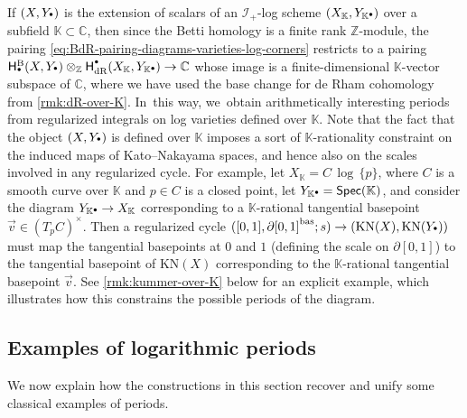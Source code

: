 \documentclass[JEP,XML,SOM,Unicode,NoFloatCountersInSection,published]{cedram}
\let\oldbullet\bullet
\renewcommand{\bullet}{{\raisebox{1pt}{$\scriptscriptstyle\oldbullet$}}}
\theoremstyle{definition}
\theoremstyle{remark}
\newenvironment{remark}
  {\pushQED{\qed}\renewcommand{\qedsymbol}{$\lozenge$}\remarkx}
  {\popQED\endremarkx}
\newcommand{\CC}{\mathbb{C}}
\newcommand{\KK}{\mathbb{K}}
\newcommand{\ZZ}{\mathbb{Z}}
\newcommand{\bas}[1]{{#1}^{\mathrm{bas}}}
\newcommand{\KN}[1]{\mathrm{KN}(#1)}
\newcommand{\Spec}[1]{\mathsf{Spec}(#1)}
\newcommand{\HdR}[2][\bullet]{\mathsf{H}_{\mathrm{dR}}^{#1}(#2)}
\newcommand{\HlgyB}[2][\bullet]{\mathsf{H}^{\mathrm{B}}_{#1}(#2)}
\newcommand{\ascat}{\mathscr{I}_+}
\begin{document}
\begin{remark}\label{rmk:periods-over-K}
If $(X,Y_\bullet)$ is the extension of scalars of an $\ascat$-log scheme $(X_\KK,Y_{\KK\bullet})$ over a subfield $\KK\subset \CC$, then since the Betti homology is a finite rank $\ZZ$-module, the pairing \eqref{eq:BdR-pairing-diagrams-varieties-log-corners} restricts to a pairing $\HlgyB{X,Y_\bullet} \otimes_\ZZ \HdR{X_\KK,Y_{\KK\bullet}} \to \CC$ whose image is a finite-dimensional $\KK$-vector subspace of $\CC$, where we have used the base change for de Rham cohomology from \autoref{rmk:dR-over-K}. In~this way, we~obtain arithmetically interesting periods from regularized integrals on log varieties defined over $\KK$. Note that the fact that the object $(X,Y_\bullet)$ is defined over $\KK$ imposes a sort of $\KK$-rationality constraint on the induced maps of Kato--Nakayama spaces, and hence also on the scales involved in any regularized cycle. For example, let $X_\KK=C\,\log\,\{p\}$, where $C$ is a smooth curve over $\KK$ and $p\in C$ is a closed point, let $Y_{\KK\bullet}=\Spec{\KK}$, and consider the diagram $Y_{\KK\bullet}\to X_\KK$ corresponding to a $\KK$-rational tangential basepoint $\vec{v}\in (T_pC)^\times$. Then a regularized cycle $([0,1],\bas{\partial[0,1]};s) \to (\KN{X},\KN{Y_\bullet})$ must map the tangential basepoints at $0$ and $1$ (defining the scale on $\partial[0,1]$) to the tangential basepoint of $\KN{X}$ corresponding to the $\KK$-rational tangential basepoint $\vec{v}$. See \autoref{rmk:kummer-over-K} below for an explicit example, which illustrates how this constrains the possible periods of the diagram.
\end{remark}

\subsection{Examples of logarithmic periods}\label{sec:period-examples}
We now explain how the constructions in this section recover and unify some classical examples of periods.
\end{document}
